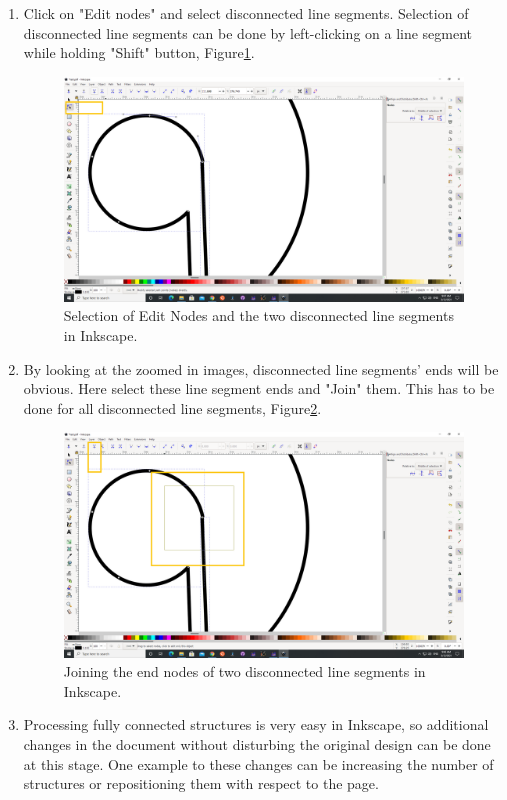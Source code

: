 \begin{enumerate}
	\item Click on "Edit nodes" and select disconnected line segments. Selection of disconnected 
	line segments can be done by left-clicking on a line segment while holding "Shift" button, 
	Figure\ref{fig:EditNodes}.
	
	\begin{figure}[H]
		\centering
		\includegraphics[angle=0,origin=c,width = .8\linewidth]{Section_ODMR_Antenna/Figures/EditNodes.png}
		\caption{Selection of Edit Nodes and the two disconnected line segments in Inkscape.}
		\label{fig:EditNodes}
	\end{figure}

	\item By looking at the zoomed in images, disconnected line segments' ends will be obvious.
	Here select these line segment ends and "Join" them. This has to be done for all disconnected
	line segments, Figure\ref{fig:JoinNodes}.

	\begin{figure}[H]
		\centering
		\includegraphics[angle=0,origin=c,width = .8\linewidth]{Section_ODMR_Antenna/Figures/JoinNodes.png}
		\caption{Joining the end nodes of two disconnected line segments in Inkscape.}
		\label{fig:JoinNodes}
	\end{figure}
	
	\item Processing fully connected structures is very easy in Inkscape, so additional changes in
	the document without disturbing the original design can be done at this stage. One example to
	these changes can be increasing the number of structures or repositioning them with respect to
	the page.
	

\end{enumerate}
